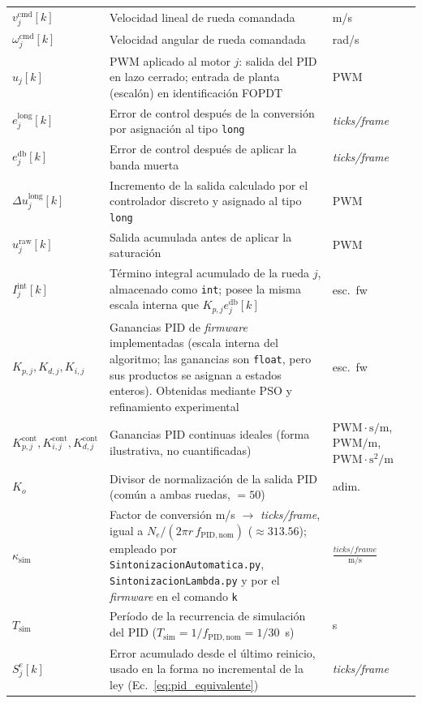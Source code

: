 \begin{appendices}
{\begin{longtable}{p{2.7cm} p{8.5cm} p{2.2cm}}
$v_j^{\mathrm{cmd}}[k]$ & Velocidad lineal de rueda comandada & m/s \\
$\omega_j^{\mathrm{cmd}}[k]$ & Velocidad angular de rueda comandada & rad/s \\
$u_j[k]$ & PWM aplicado al motor $j$: salida del PID en lazo cerrado; entrada de planta (escalón) en identificación FOPDT & PWM \\
$e_j^{\mathrm{long}}[k]$ & Error de control después de la conversión por asignación al tipo \texttt{long} & \textit{ticks/frame} \\
$e_j^{\mathrm{db}}[k]$ & Error de control después de aplicar la banda muerta & \textit{ticks/frame} \\
$\Delta u_j^{\mathrm{long}}[k]$ & Incremento de la salida calculado por el controlador discreto y asignado al tipo \texttt{long} & PWM \\
$u_j^{\mathrm{raw}}[k]$ & Salida acumulada antes de aplicar la saturación & PWM \\
$I_j^{\mathrm{int}}[k]$ & Término integral acumulado de la rueda $j$, almacenado como \texttt{int}; posee la misma escala interna que $K_{p,j}e_j^{\mathrm{db}}[k]$ & esc.\ fw \\
$K_{p,j},K_{d,j},K_{i,j}$ & Ganancias PID de \textit{firmware} implementadas (escala interna del algoritmo; las ganancias son \texttt{float}, pero sus productos se asignan a estados enteros). Obtenidas mediante PSO y refinamiento experimental & esc.\ fw \\
$K_{p,j}^{\mathrm{cont}},K_{i,j}^{\mathrm{cont}},K_{d,j}^{\mathrm{cont}}$ & Ganancias PID continuas ideales (forma ilustrativa, no cuantificadas) & $\mathrm{PWM\cdot s/m}$,\ $\mathrm{PWM/m}$,\ $\mathrm{PWM\cdot s^{2}/m}$ \\
$K_o$ & Divisor de normalización de la salida PID (común a ambas ruedas, $=50$) & adim. \\
$\kappa_{\mathrm{sim}}$ & Factor de conversión m/s $\to$ \textit{ticks/frame}, igual a $N_e/(2\pi r\,f_{\mathrm{PID,nom}})$ ($\approx313.56$); empleado por \texttt{SintonizacionAutomatica.py}, \texttt{SintonizacionLambda.py} y por el \textit{firmware} en el comando \texttt{k} & $\frac{\textit{ticks/frame}}{\text{m/s}}$ \\
$T_{\mathrm{sim}}$ & Período de la recurrencia de simulación del PID ($T_{\mathrm{sim}}=1/f_{\mathrm{PID,nom}}=1/30$~s) & s \\
$S_j^{e}[k]$ & Error acumulado desde el último reinicio, usado en la forma no incremental de la ley (Ec.~\eqref{eq:pid_equivalente}) & \textit{ticks/frame} \\

\end{longtable}}
\end{appendices}
